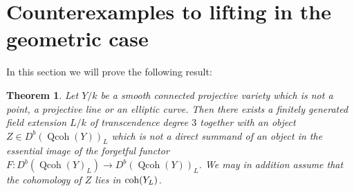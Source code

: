 \documentclass{amsart}
\numberwithin{equation}{section}
\newtheorem{theorem}[lemma]{Theorem}
\theoremstyle{definition}
\theoremstyle{remark}
\begin{document}
\section{Counterexamples to lifting in the geometric case}
In this section we will prove the following result:
\begin{theorem}
\label{ref-7.1-41}
Let $Y/k$ be a smooth connected projective variety which is not a point, a projective line or an elliptic curve. Then there exists a finitely generated field extension $L/k$
  of transcendence degree $3$ together with an object $Z\in D^b({\operatorname{Qcoh}}(Y))_L$ which is not a direct summand of an object in 
the essential image of the forgetful functor $F:D^b({\operatorname{Qcoh}}(Y)_L){\rightarrow} D^b({\operatorname{Qcoh}}(Y))_L$. We may in addition
assume that the cohomology of $Z$ lies in ${\mathop{\text{\upshape{coh}}}}(Y_L)$.
\end{theorem}
\end{document}
